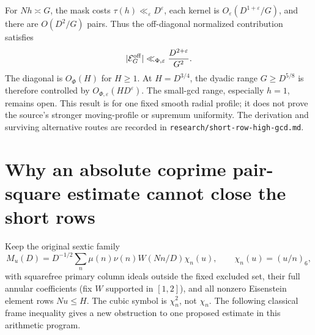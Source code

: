 \documentclass[11pt,oneside,openany]{book}
\theoremstyle{definition}\newtheorem{definition}[theorem]{Definition}
\theoremstyle{remark}\newtheorem{remark}[theorem]{Remark}
\begin{document}
For $Nh\asymp G$, the mask costs $\tau(h)\ll_\varepsilon D^\varepsilon$, each kernel is $O_\varepsilon(D^{1+\varepsilon}/G)$, and there are $O(D^2/G)$ pairs. Thus the off-diagonal normalized contribution satisfies
\[
 |\mathcal E_G^{\rm off}|\ll_{\Phi,\varepsilon}\frac{D^{2+\varepsilon}}{G^2}.
\]
The diagonal is $O_\Phi(H)$ for $H\ge1$. At $H=D^{3/4}$, the dyadic range $G\ge D^{5/8}$ is therefore controlled by $O_{\Phi,\varepsilon}(HD^\varepsilon)$. The small-gcd range, especially $h=1$, remains open. This result is for one fixed smooth radial profile; it does not prove the source's stronger moving-profile or supremum uniformity. The derivation and surviving alternative routes are recorded in \texttt{research/short-row-high-gcd.md}.

\section{Why an absolute coprime pair-square estimate cannot close the short rows}
\label{sec:pair-barrier}
Keep the original sextic family
\[
 M_u(D)=D^{-1/2}\sum_n\mu(n)\nu(n)W(Nn/D)\chi_n(u),
 \qquad \chi_n(u)=(u/n)_6,
\]
with squarefree primary column ideals outside the fixed excluded set,
their full annular coefficients (fix $W$ supported in $[1,2]$), and all
nonzero Eisenstein element rows
$Nu\le H$. The cubic symbol is $\chi_n^2$, not $\chi_n$.
The following classical frame inequality \cite{WelchGeometry} gives a new
obstruction to one proposed estimate in this arithmetic program.
\end{document}
